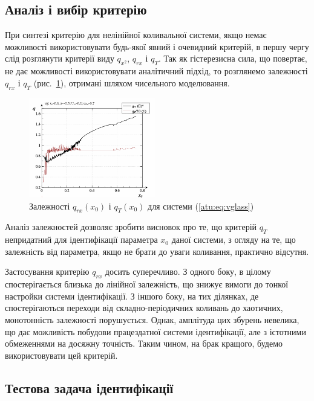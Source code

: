 \subsection{Аналіз і вибір критерію} %

При синтезі критерію для нелінійної коливальної системи, якщо
немає можливості використовувати будь-якої явний і очевидний
критерій, в першу чергу слід розглянути критерії виду
$q_{x^2}$,
$q_{rx}$ і
$q_T$. Так як гістерезисна сила, що повертає, не дає можливості
використовувати аналітичний підхід, то розглянемо залежності
$q_{rx} $ і
$q_T$ (рис.~\ref{atu:f:vglass_q}), отримані шляхом чисельного моделювання.

\begin{figure}[htb!]
\begin{center}
  \includegraphics[width=0.49\textwidth]{p/cha/vg/vg_q1-p_q.png}
\end{center}
  \caption{Залежності $q_{rx}(x_0)$ і $q_T(x_0)$ для системи (\ref{atu:eq:vglass})}
\label{atu:f:vglass_q}
\end{figure}

Аналіз залежностей дозволяє зробити висновок про те, що критерій
$q_T$ непридатний для ідентифікації параметра
$x_0$ даної системи, з огляду на те, що залежність від параметра,
якщо не брати до уваги коливання, практично відсутня.

Застосування критерію
$q_{rx} $ досить суперечливо. З одного боку, в цілому
спостерігається близька до лінійної залежність, що знижує
вимоги до тонкої настройки системи ідентифікації. З іншого
боку, на тих ділянках, де спостерігаються переходи від
складно-періодичних коливань до хаотичних, монотонність
залежності порушується. Однак, амплітуда цих збурень невелика,
що дає можливість побудови працездатної системи ідентифікації,
але з істотними обмеженнями на досяжну точність. Таким чином,
на брак кращого, будемо використовувати цей критерій.



\subsection{Тестова задача ідентифікації} %

